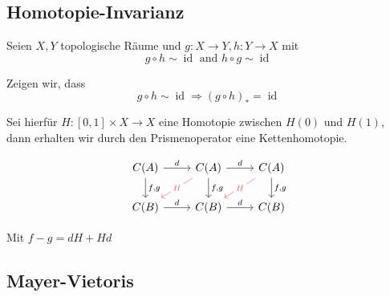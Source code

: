 \documentclass{article}
\DeclareMathOperator{\id}{id}
\begin{document}
	\subsection{Homotopie-Invarianz}
	
	Seien $X, Y$ topologische Räume und $g: X→Y, h: Y→X$ mit
	\begin{equation*}
		g ∘ h \sim \id \text{ and } h∘g \sim \id
	\end{equation*}
	
	Zeigen wir, dass
	\begin{equation*}
		g∘h \sim \id ⇒ (g∘h)_* = \id
	\end{equation*}
	
	Sei hierfür $H: [0,1] × X → X$ eine Homotopie zwischen $H(0)$ und $H(1)$, dann erhalten wir durch den Prismenoperator eine Kettenhomotopie.
	
	\[\begin{tikzcd}
		{C(A)} & {C(A)} & {C(A)} \\
		{C(B)} & {C(B)} & {C(B)}
		\arrow["d", from=1-1, to=1-2]
		\arrow["{f,g}", from=1-1, to=2-1]
		\arrow["d", from=1-2, to=1-3]
		\arrow["H"{description}, color={rgb,255:red,214;green,92;blue,92}, from=1-2, to=2-1]
		\arrow["{f,g}", from=1-2, to=2-2]
		\arrow["H"{description}, color={rgb,255:red,214;green,92;blue,92}, from=1-3, to=2-2]
		\arrow["{f,g}", from=1-3, to=2-3]
		\arrow["d", from=2-1, to=2-2]
		\arrow["d", from=2-2, to=2-3]
	\end{tikzcd}\]
	
	Mit $f-g = dH + Hd$
	
	\subsection{Mayer-Vietoris}
	
\end{document}
